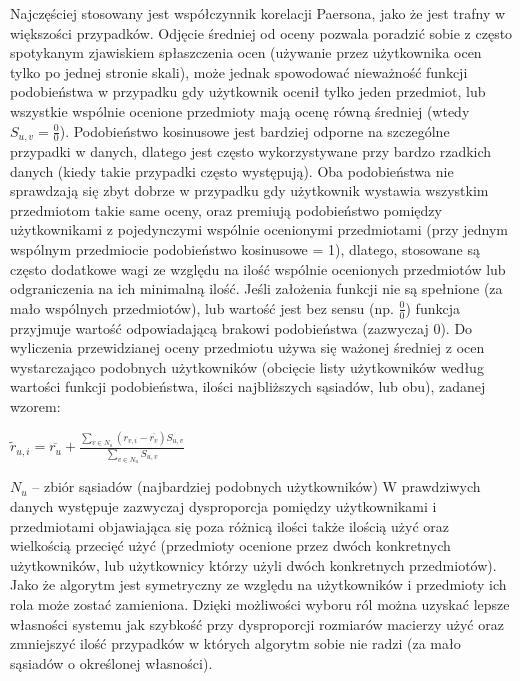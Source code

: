 \documentclass{pracamgr}
\begin{document}
    Najczęściej stosowany jest współczynnik korelacji Paersona, jako że jest trafny w większości przypadków.
    Odjęcie średniej od oceny pozwala poradzić sobie z często spotykanym zjawiskiem spłaszczenia ocen (używanie przez użytkownika ocen tylko po jednej stronie skali),
    może jednak spowodować nieważność funkcji podobieństwa w przypadku gdy użytkownik ocenił tylko jeden przedmiot,
    lub wszystkie wspólnie ocenione przedmioty mają ocenę równą średniej (wtedy $S_{u,v}=\frac{0}{0}$).
    Podobieństwo kosinusowe jest bardziej odporne na szczególne przypadki w danych,
    dlatego jest często wykorzystywane przy bardzo rzadkich danych (kiedy takie przypadki często występują).
    Oba podobieństwa nie sprawdzają się zbyt dobrze w przypadku gdy użytkownik wystawia wszystkim przedmiotom takie same oceny,
    oraz premiują podobieństwo pomiędzy użytkownikami z pojedynczymi wspólnie ocenionymi przedmiotami (przy jednym wspólnym przedmiocie podobieństwo kosinusowe = 1),
    dlatego, stosowane są często dodatkowe wagi ze względu na ilość wspólnie ocenionych przedmiotów lub odgraniczenia na ich minimalną ilość.
    Jeśli założenia funkcji nie są spełnione (za mało wspólnych przedmiotów), lub wartość jest bez sensu (np. $\frac{0}{0}$)
    funkcja przyjmuje wartość odpowiadającą brakowi podobieństwa (zazwyczaj 0).\newline\newline
    Do wyliczenia przewidzianej oceny przedmiotu używa się ważonej średniej z ocen wystarczająco podobnych użytkowników
    (obcięcie listy użytkowników według wartości funkcji podobieństwa, ilości najbliższych sąsiadów, lub obu), zadanej wzorem:\newline
    \begin{center}
     $\tilde{r}_{u,i}=\overline{r_{u}}+\frac{\sum\limits_{v\in N_u}(r_{v,i}-\overline{r_v})S_{u,v}}{\sum\limits_{v\in N_u}S_{u,v}}$
    \end{center}
    {\scriptsize
     $N_u$ -- zbiór sąsiadów (najbardziej podobnych użytkowników)
    }\newline\newline
    W prawdziwych danych występuje zazwyczaj dysproporcja pomiędzy użytkownikami i przedmiotami objawiająca się poza różnicą ilości także
    ilością użyć oraz wielkością przecięć użyć (przedmioty ocenione przez dwóch konkretnych użytkowników,
    lub użytkownicy którzy użyli dwóch konkretnych przedmiotów).
    Jako że algorytm jest symetryczny ze względu na użytkowników i przedmioty ich rola może zostać zamieniona.    
    Dzięki możliwości wyboru ról można uzyskać lepsze własności systemu jak szybkość przy dysproporcji rozmiarów macierzy użyć oraz zmniejszyć
    ilość przypadków w których algorytm sobie nie radzi (za mało sąsiadów o określonej własności).
\end{document}
